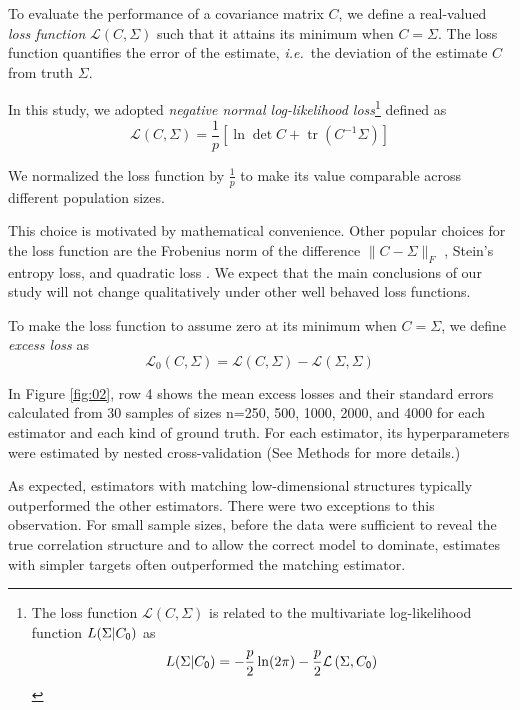 \documentclass[10pt]{article}
\DeclareMathOperator{\Tr}{tr}
\newcommand{\loss}[1]{\mathcal L\left(#1\right)}
\newcommand{\eloss}[1]{\mathcal L_0\left(#1\right)}
\begin{document}
To evaluate the performance of a covariance matrix $C$, we define a real-valued \emph{loss function} $\loss{C,\Sigma}$ such that it attains its minimum when $C=\Sigma$.  The loss function quantifies the error of the estimate, \emph{i.e.}~the deviation of the estimate $C$ from truth $\Sigma$.

In this study, we adopted \emph{negative normal log-likelihood loss}\footnote{
The loss function $\loss{C,\Sigma}$ is related to the multivariate log-likelihood function $L(\Sigma|C_{\sf 0})$ as
\begin{equation*}
    L(\Sigma|C_{\sf 0}) = -\frac p 2 \ln(2\pi) -\frac p 2 \loss{\Sigma,C_{\sf 0}}
\end{equation*}
}
defined as
\begin{equation}\label{eq:loss}
    \loss{C,\Sigma} = \frac 1 p\left[\ln \det C + \Tr(C^{-1}\Sigma)\right]
\end{equation}

We normalized the loss function  by $\frac 1 p$ to make its value comparable across different population sizes. 

This choice is motivated by mathematical convenience. Other popular choices for the loss function are the Frobenius norm of the difference $\|C-\Sigma\|_F$ \cite{Ledoit:2004,Schafer:2005}, Stein's entropy loss, and quadratic loss \cite{James:1961,Fan:2008}.  We expect that the main conclusions of our study will not change qualitatively under other well behaved loss functions.

To make the loss function to assume zero at its minimum when $C=\Sigma$, we define \emph{excess loss} as
\begin{equation}\label{eq:excess-loss}
    \eloss{C,\Sigma} = \loss{C,\Sigma}-\loss{\Sigma,\Sigma}
\end{equation}

In Figure \ref{fig:02}, row 4 shows the mean excess losses and their standard errors calculated from 30 samples of sizes n=250, 500, 1000, 2000, and 4000 for each estimator and each kind of ground truth. For each estimator, its hyperparameters were estimated by nested cross-validation (See Methods for more details.)

As expected, estimators with matching low-dimensional structures typically outperformed the other estimators. There were two exceptions to this observation. For small sample sizes, before the data were sufficient to reveal the true correlation structure and to  allow the correct model to dominate, estimates with simpler targets often outperformed the matching estimator.
\end{document}
